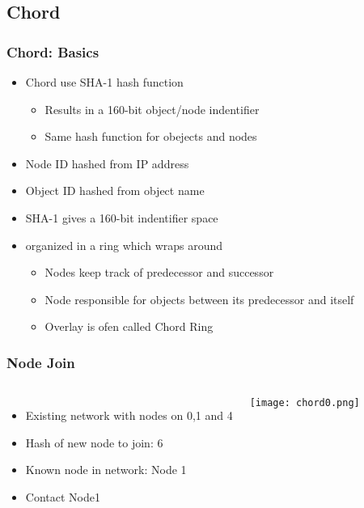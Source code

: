 \subsection{Chord}
\begin{frame}
    \frametitle{Chord: Basics}
    \begin{itemize}
        \item Chord use SHA-1 hash function
        \begin{itemize}
            \item Results in a 160-bit object/node indentifier
            \item Same hash function for obejects and nodes
        \end{itemize}
        \item Node ID hashed from IP address
        \item Object ID hashed from object name \\

        \item SHA-1 gives a 160-bit indentifier space
        \item organized in a \alert{ring} which wraps around
        \begin{itemize}
            \item Nodes keep track of \alert{predecessor} and \alert{successor}
            \item Node responsible for objects between its predecessor and itself
            \item Overlay is ofen called \alert{Chord Ring}
        \end{itemize}
    \end{itemize}
\end{frame}

\begin{frame}
    \frametitle{Node Join}
    \begin{columns}
        \begin{itemize}
            \item Existing network with nodes on 0,1 and 4
            \item Hash of new node to join: 6
            \item Known node in network: Node 1
            \item Contact Node1
        \end{itemize}
            \texttt{[image: chord0.png]}
    \end{columns}
 \end{frame}

